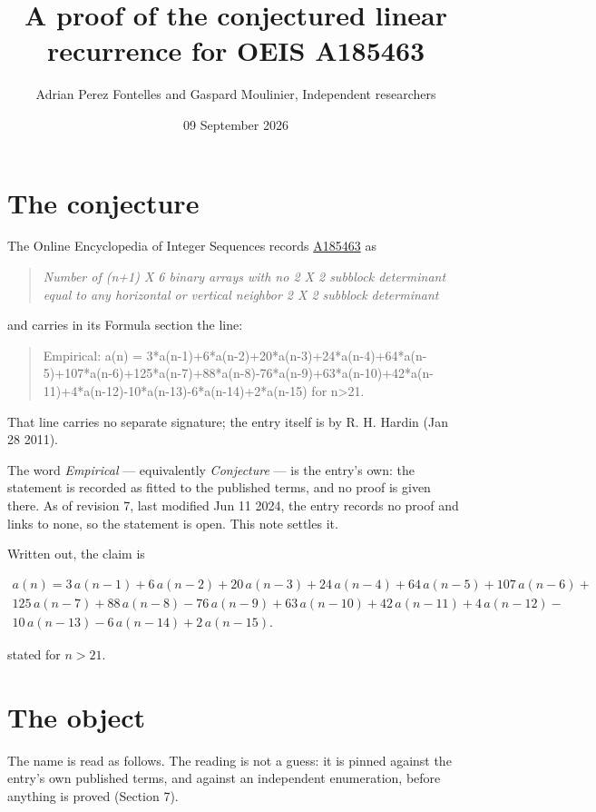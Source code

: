 \documentclass[11pt]{article}
\title{A proof of the conjectured linear recurrence for OEIS A185463}
\author{Adrian Perez Fontelles and Gaspard Moulinier, Independent researchers}
\date{09 September 2026}
\theoremstyle{definition}
\begin{document}
\maketitle
\section{The conjecture}

The Online Encyclopedia of Integer Sequences records \href{https://oeis.org/A185463}{A185463} as

\begin{quote}\itshape Number of (n+1) X 6 binary arrays with no 2 X 2 subblock determinant equal to any horizontal or vertical neighbor 2 X 2 subblock determinant\end{quote}

and carries in its Formula section the line:

\begin{quote}\ttfamily Empirical: a(n) = 3*a(n-1)+6*a(n-2)+20*a(n-3)+24*a(n-4)+64*a(n-5)+107*a(n-6)+125*a(n-7)+88*a(n-8)-76*a(n-9)+63*a(n-10)+42*a(n-11)+4*a(n-12)-10*a(n-13)-6*a(n-14)+2*a(n-15) for n>21.\end{quote}

That line carries no separate signature; the entry itself is by R. H. Hardin (Jan 28 2011).

The word {\itshape Empirical} --- equivalently {\itshape Conjecture} --- is the entry's own: the statement is recorded as fitted to the published terms, and no proof is given there. As of revision 7, last modified Jun 11 2024, the entry records no proof and links to none, so the statement is open. This note settles it.

Written out, the claim is

\begin{multline*} a(n) = 3\,a(n-1) + 6\,a(n-2) + 20\,a(n-3) + 24\,a(n-4) + 64\,a(n-5) + 107\,a(n-6) + \\ 125\,a(n-7) + 88\,a(n-8) - 76\,a(n-9) + 63\,a(n-10) + 42\,a(n-11) + 4\,a(n-12) - \\ 10\,a(n-13) - 6\,a(n-14) + 2\,a(n-15). \end{multline*}

stated for $n > 21$.

\section{The object}

The name is read as follows. The reading is not a guess: it is pinned against the entry's own published terms, and against an independent enumeration, before anything is proved (Section 7).
\end{document}
